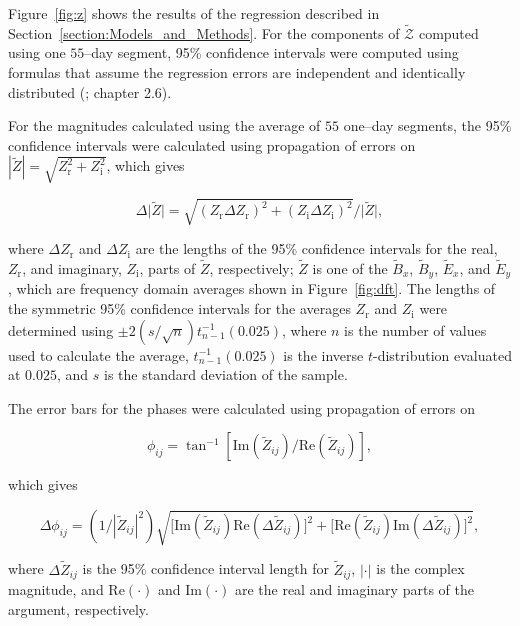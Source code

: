 \documentclass[pdflatex,sn-basic]{sn-jnl}%
\begin{document}
Figure~\ref{fig:z} shows the results of the regression described in Section~\ref{section:Models_and_Methods}. For the components of $\boldsymbol{\mathcal{\widetilde{Z}}}$ computed using one $55$--day segment, 95\% confidence intervals were computed using formulas that assume the regression errors are independent and identically distributed (\cite{Draper1981}; chapter 2.6).

For the magnitudes calculated using the average of $55$ one--day segments, the 95\% confidence intervals were calculated using propagation of errors on $|\widetilde{Z}| = \sqrt{Z_\text{r}^2 + Z_\text{i}^2}$, which gives

\begin{equation}
\Delta\big|\widetilde{Z}\big| = \sqrt{(Z_\text{r}\Delta Z_\text{r})^2 + (Z_\text{i}\Delta Z_\text{i})^2} / \big|\widetilde{Z}\big|,
\end{equation}

\noindent
where $\Delta Z_\text{r}$ and $\Delta Z_\text{i}$ are the lengths of the 95\% confidence intervals for the real, $Z_\text{r}$, and imaginary, $Z_\text{i}$, parts of $\widetilde{Z}$, respectively; $\widetilde{Z}$ is one of the $\widetilde{B}_x$, $\widetilde{B}_y$, $\widetilde{E}_x$, and $\widetilde{E}_y$, which are frequency domain averages shown in Figure~\ref{fig:dft}. The lengths of the symmetric 95\% confidence intervals for the averages $Z_\text{r}$ and $Z_\text{i}$ were determined using $\pm 2 (s/\sqrt{n})t^{-1}_{n-1}(0.025)$, where $n$ is the number of values used to calculate the average, $t^{-1}_{n-1}(0.025)$ is the inverse $t$-distribution evaluated at $0.025$, and $s$ is the standard deviation of the sample.

The error bars for the phases were calculated using propagation of errors on

$$\phi_{ij} = \tan^{-1}[
  \text{Im}(\widetilde{Z}_{ij})
  /
  \text{Re}(\widetilde{Z}_{ij})],
$$

\noindent which gives

$$
  \Delta\phi_{ij} = (1/|\widetilde{Z}_{ij}|^2)
  \sqrt{
    \big[
      \text{Im}(\widetilde{Z}_{ij})\text{Re}(\Delta \widetilde{Z}_{ij})
    \big]^2
    +
    \big[
      \text{Re}(\widetilde{Z}_{ij})\text{Im}(\Delta \widetilde{Z}_{ij})
    \big]^2
  },
$$

\noindent
where $\Delta \widetilde{Z}_{ij}$ is the 95\% confidence interval length for $\widetilde{Z}_{ij}$, $|\boldsymbol{\cdotp}|$ is the complex magnitude, and $\text{Re}(\boldsymbol{\cdotp})$ and $\text{Im}(\boldsymbol{\cdotp})$ are the real and imaginary parts of the argument, respectively.
\end{document}
